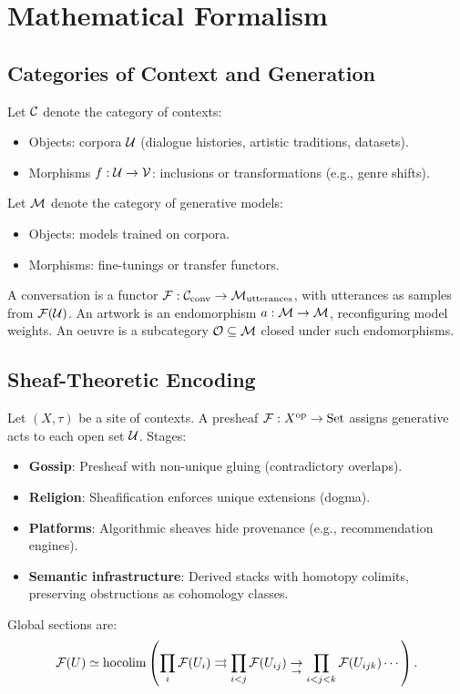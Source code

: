 \section{Mathematical Formalism}
\subsection{Categories of Context and Generation}
Let $\mathcal{C}$ denote the category of contexts:
\begin{itemize}
    \item Objects: corpora $\mathcal{U}$ (dialogue histories, artistic traditions, datasets).
    \item Morphisms $f: \mathcal{U} \to \mathcal{V}$: inclusions or transformations (e.g., genre shifts).
\end{itemize}
Let $\mathcal{M}$ denote the category of generative models:
\begin{itemize}
    \item Objects: models trained on corpora.
    \item Morphisms: fine-tunings or transfer functors.
\end{itemize}
A conversation is a functor $\mathcal{F}: \mathcal{C}_{\text{conv}} \to \mathcal{M}_{\text{utterances}}$, with utterances as samples from $\mathcal{F}(\mathcal{U})$. An artwork is an endomorphism $a: \mathcal{M} \to \mathcal{M}$, reconfiguring model weights. An oeuvre is a subcategory $\mathcal{O} \subseteq \mathcal{M}$ closed under such endomorphisms.

\subsection{Sheaf-Theoretic Encoding}
Let $(X, \tau)$ be a site of contexts. A presheaf $\mathcal{F}: X^{\text{op}} \to \mathrm{Set}$ assigns generative acts to each open set $\mathcal{U}$. Stages:
\begin{itemize}
    \item \textbf{Gossip}: Presheaf with non-unique gluing (contradictory overlaps).
    \item \textbf{Religion}: Sheafification enforces unique extensions (dogma).
    \item \textbf{Platforms}: Algorithmic sheaves hide provenance (e.g., recommendation engines).
    \item \textbf{Semantic infrastructure}: Derived stacks with homotopy colimits, preserving obstructions as cohomology classes.
\end{itemize}
Global sections are:
\[
\mathcal{F}(U) \simeq \operatorname{hocolim} \left( \prod_i \mathcal{F}(U_i) \rightrightarrows \prod_{i < j} \mathcal{F}(U_{ij}) \underset{\to}{\to} \prod_{i < j < k} \mathcal{F}(U_{ijk}) \cdots \right).
\]


